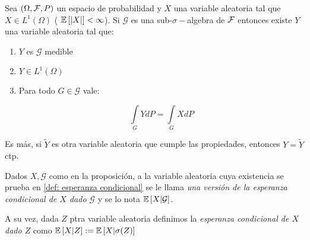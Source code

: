 \begin{proposition}
	\label{def: esperanza condicional}
	Sea $\left(\Omega, \mathcal{F}, P\right)$ un espacio de probabilidad y $X$ una variable aleatoria tal que $X \in L^1(\Omega)$ ( \Eg $\mathbb{E} \left[\left\lvert X\right\rvert\right] < \infty$). Si $\mathcal{G}$ es una sub-$\sigma-$algebra de $\mathcal{F}$ entonces existe $Y$ una variable aleatoria tal que:
	
	\begin{enumerate}
		\item $Y$ es $\mathcal{G}$ medible
		\item $Y \in L^1(\Omega)$
		\item Para todo $G \in \mathcal{G}$ vale:
		
		\begin{equation*}
			\int\limits_{G} {Y dP} = \int\limits_{G} {X dP}
		\end{equation*}
	\end{enumerate}

	Es m\'as, si $\widetilde{Y}$ es otra variable aleatoria que cumple las propiedades, entonces $Y = \widetilde{Y}$ ctp.
	
\end{proposition}

\begin{definition}
	Dados $X,\mathcal{G}$ como en la proposici\'on, a la variable aleatoria cuya existencia se prueba en \ref{def: esperanza condicional} se le llama \textit{una versi\'on de la esperanza condicional de $X$ dado $\mathcal{G}$} y se lo nota $\mathbb{E} \left[X \vert \mathcal{G}\right]$.
	
	A su vez, dada $Z$ ptra variable aleatoria definimos la \textit{esperanza condicional de $X$ dado $Z$} como $\mathbb{E} \left[X \vert Z\right] := \mathbb{E} \left[X \vert \sigma(Z)\right]$
	
\end{definition}

